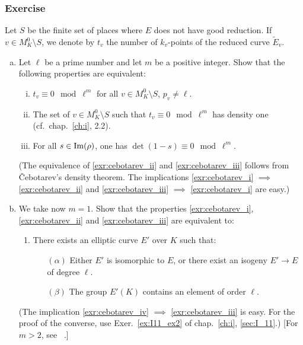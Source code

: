\subsubsection*{Exercise}
Let $S$ be the finite set of places where $E$ does not have good reduction. If
$v \in M_K^0 \setminus S$, we denote by $t_v$ the number of $k_v$-points of the
reduced curve $\widetilde{E}_v$.
\begin{enumerate}[(a)]
	\item Let $\ell$ be a prime number and let $m$ be a positive integer.
		Show that the following properties are equivalent:
	\begin{enumerate}[(i)]
		\item\label{exr:cebotarev_i}
			$t_v \equiv 0 \mod{\ell^m}$ for all $v \in M_K^0 \setminus S$, $p_v \ne \ell$.
		\item\label{exr:cebotarev_ii}
			The set of $v \in M_K^0 \setminus S$ such that $t_v
			\equiv 0 \mod{\ell^m}$ has density one (cf.\ 
			chap.~\ref{ch:i}, 2.2).
		\item\label{exr:cebotarev_iii}
			For all $s \in \operatorname{Im}(\rho)$, one has $\det(1-s) \equiv 0 \mod{\ell^m}$.
	\end{enumerate}
	(The equivalence of \ref{exr:cebotarev_ii} and \ref{exr:cebotarev_iii}
	follows from \v Cebotarev's density theorem. The implications
	\ref{exr:cebotarev_i} $\implies$ \ref{exr:cebotarev_ii} and
	\ref{exr:cebotarev_iii} $\implies$ \ref{exr:cebotarev_i} are easy.)

	\item We take now $m = 1$. Show that the properties
		\ref{exr:cebotarev_i}, \ref{exr:cebotarev_ii} and
		\ref{exr:cebotarev_iii} are equivalent to:
	\begin{enumerate}[resume*]
		\item\label{exr:cebotarev_iv}
			There exists an elliptic curve $E'$ over $K$ such that:
		\begin{itemize}
			\item[$(\alpha)$]
				Either $E'$ is isomorphic to $E$, or there
				exist an isogeny $E' \to E$ of degree $\ell$.
			\item[$(\beta)$]
				The group $E'(K)$ contains an element of order
				$\ell$.
		\end{itemize}
	\end{enumerate}
	(The implication \ref{exr:cebotarev_iv} $\implies$
	\ref{exr:cebotarev_iii} is easy. For the proof of the converse, use
	Exer.~\ref{ex:I11_ex2} of chap.~\ref{ch:i}, \ref{sec:I_11}.)
	[For $m > 2$, see \citeauthor{64}~\cite{64}.]
\end{enumerate}

